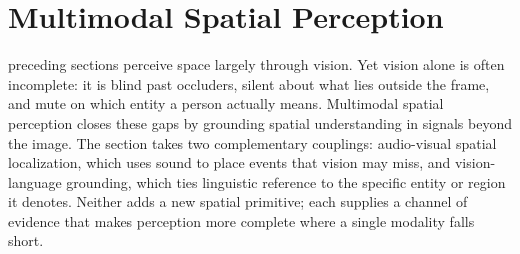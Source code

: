 
\section{Multimodal Spatial Perception}
\label{sec:p3-sec6-5-multimodal-spatial-perception}

 preceding sections perceive space largely through vision. Yet vision alone is often incomplete: it is blind past occluders, silent about what lies outside the frame, and mute on which entity a person actually means. Multimodal spatial perception closes these gaps by grounding spatial understanding in signals beyond the image. The section takes two complementary couplings: audio-visual spatial localization, which uses sound to place events that vision may miss, and vision-language grounding, which ties linguistic reference to the specific entity or region it denotes. Neither adds a new spatial primitive; each supplies a channel of evidence that makes perception more complete where a single modality falls short.



